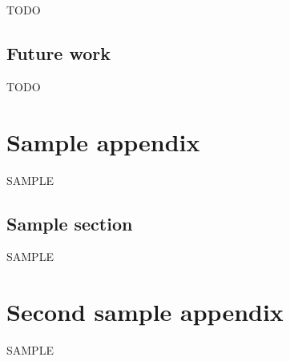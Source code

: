 \documentclass[12pt]{report}
\begin{document}
TODO

\section{Future work}

TODO

\appendices  %

\chapter{Sample appendix}
SAMPLE
\section{Sample section}
SAMPLE

\chapter{Second sample appendix}
SAMPLE




\end{document}

